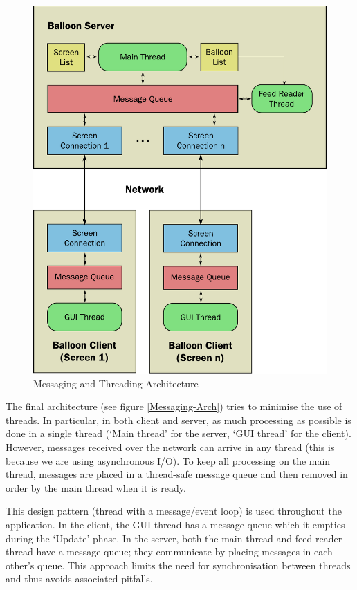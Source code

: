 \begin{figure}
\begin{centering}
\includegraphics[scale=0.95]{Diagrams/messaging}
\par\end{centering}

\caption{Messaging and Threading Architecture}
\label{Messaging-Arch}
\end{figure}

The final architecture (see figure \vref{Messaging-Arch}) tries to minimise the
use of threads. In particular, in both client and server, as much processing as
possible is done in a single thread (`Main thread' for the server, `GUI thread'
for the client). However, messages received over the network
can arrive in any thread (this is because we are using asynchronous I/O). To 
keep all processing on the main thread, messages are placed in a thread-safe
message queue and then removed in order by the main thread when it is ready. 

This design pattern (thread with a message/event loop) is used throughout the
application. In the client, the GUI thread has a message queue which it empties
during the `Update' phase. In the server, both the main thread and feed reader 
thread have a message queue; they communicate by placing messages in each other's
queue. This approach limits the need for synchronisation between threads and 
thus avoids associated pitfalls.

